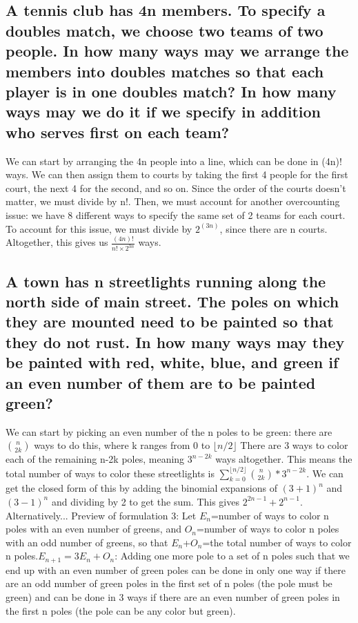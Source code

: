 \documentclass[11pt,twosided]{article}
\begin{document}
\subsection{A tennis club has 4n members. To specify a doubles match, we choose two teams of two people. In how many ways may we arrange the members into doubles matches so that each player is in one doubles match? In how many ways may we do it if we specify in addition who serves first on each team?}
We can start by arranging the 4n people into a line, which can be done in (4n)! ways. We can then assign them to courts by taking the first 4 people for the first court, the next 4 for the second, and so on. Since the order of the courts doesn't matter, we must divide by n!. Then, we must account for another overcounting issue: we have 8 different ways to specify the same set of 2 teams for each court. To account for this issue, we must divide by $2^{(3n)}$, since there are n courts. Altogether, this gives us \(\frac{(4n)!}{n! \times 2^{3n}}\) ways.


\subsection{A town has n streetlights running along the north side of main street. The poles on which they are mounted need to be painted so that they do not rust. In how many ways may they be painted with red, white, blue, and green if an even number of them are to be painted green?}
We can start by picking an even number of the n poles to be green: there are ${n \choose 2k}$ ways to do this, where k ranges from 0 to ${\lfloor {n/2} \rfloor}$ There are 3 ways to color each of the remaining n-2k poles, meaning $3^{n-2k}$ ways altogether. This means the total number of ways to color these streetlights is $\sum_{k=0}^{\lfloor{n/2} \rfloor} {{n \choose 2k} * 3^{n-2k}}$. We can get the closed form of this by adding the binomial expansions of $(3+1)^n$ and $(3-1)^n$ and dividing by 2 to get the sum. This gives $2^{2n-1}+2^{n-1}$. 
\newline
Alternatively...
\newline
Preview of formulation 3:
\newline
Let $E_n$=number of ways to color n poles with an even number of greens, and $O_n$=number of ways to color n poles with an odd number of greens, so that $E_n$+$O_n$=the total number of ways to color n poles.$E_{n+1}=3E_n+O_n$: Adding one more pole to a set of n poles such that we end up with an even number of green poles can be done in only one way if there are an odd number of green poles in the first set of n poles (the pole must be green) and can be done in 3 ways if there are an even number of green poles in the first n poles (the pole can be any color but green). 
\end{document}

